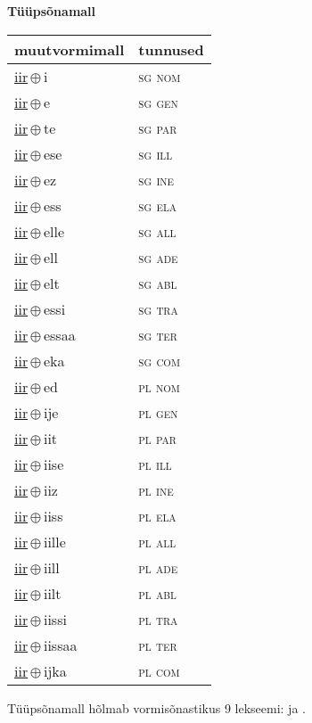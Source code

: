 

\vspace{3.5em}
\noindent \begin{minipage}{\textwidth}
\noindent \textbf{Tüüpsõnamall \,}\\

\begin{sideways}
\begin{tabular}{l l}
muutvormimall & tunnused \\
\hline
\underline{iir}\,$\oplus$\,i & \textsc{ sg nom } \\
\underline{iir}\,$\oplus$\,e & \textsc{ sg gen } \\
\underline{iir}\,$\oplus$\,te & \textsc{ sg par } \\
\underline{iir}\,$\oplus$\,ese & \textsc{ sg ill } \\
\underline{iir}\,$\oplus$\,ez & \textsc{ sg ine } \\
\underline{iir}\,$\oplus$\,ess & \textsc{ sg ela } \\
\underline{iir}\,$\oplus$\,elle & \textsc{ sg all } \\
\underline{iir}\,$\oplus$\,ell & \textsc{ sg ade } \\
\underline{iir}\,$\oplus$\,elt & \textsc{ sg abl } \\
\underline{iir}\,$\oplus$\,essi & \textsc{ sg tra } \\
\underline{iir}\,$\oplus$\,essaa & \textsc{ sg ter } \\
\underline{iir}\,$\oplus$\,eka & \textsc{ sg com } \\
\underline{iir}\,$\oplus$\,ed & \textsc{ pl nom } \\
\underline{iir}\,$\oplus$\,ije & \textsc{ pl gen } \\
\underline{iir}\,$\oplus$\,iit & \textsc{ pl par } \\
\underline{iir}\,$\oplus$\,iise & \textsc{ pl ill } \\
\underline{iir}\,$\oplus$\,iiz & \textsc{ pl ine } \\
\underline{iir}\,$\oplus$\,iiss & \textsc{ pl ela } \\
\underline{iir}\,$\oplus$\,iille & \textsc{ pl all } \\
\underline{iir}\,$\oplus$\,iill & \textsc{ pl ade } \\
\underline{iir}\,$\oplus$\,iilt & \textsc{ pl abl } \\
\underline{iir}\,$\oplus$\,iissi & \textsc{ pl tra } \\
\underline{iir}\,$\oplus$\,iissaa & \textsc{ pl ter } \\
\underline{iir}\,$\oplus$\,ijka & \textsc{ pl com } \\
\end{tabular}
\end{sideways}
\label{tab:tüüpsõnamall-iiri}

\end{minipage}

 
\vspace{1em}
\noindent Tüüpsõnamall  hõlmab vormisõnastikus 9 lekseemi:  ja .
